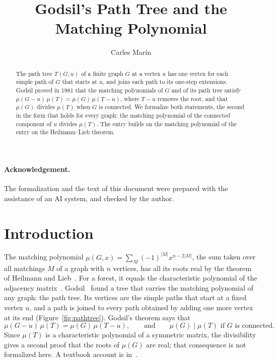 \documentclass[10pt,a4paper]{article}
\begin{document}
\title{Godsil's Path Tree and the Matching Polynomial}
\author{Carles Mar\'in}
\maketitle

\begin{abstract}
The path tree $T(G, u)$ of a finite graph $G$ at a vertex $u$ has one vertex for each simple path of $G$ that starts
at $u$, and joins each path to its one-step extensions. Godsil proved in 1981 that the matching polynomials of $G$
and of its path tree satisfy $\mu(G-u)\,\mu(T) = \mu(G)\,\mu(T-u)$, where $T - u$ removes the root, and that
$\mu(G)$ divides $\mu(T)$ when $G$ is connected. We formalize both statements, the second in the form that holds for
every graph: the matching polynomial of the connected component of $u$ divides $\mu(T)$. The entry builds on the
matching polynomial of the entry on the Heilmann--Lieb theorem.
\end{abstract}

\paragraph{Acknowledgement.} The formalization and the text of this document were prepared with the
assistance of an AI system, and checked by the author.

\tableofcontents

\section*{Introduction}

The matching polynomial $\mu(G, x) = \sum_M (-1)^{|M|} x^{n - 2|M|}$, the sum taken over all matchings $M$ of a graph
with $n$ vertices, has all its roots real by the theorem of Heilmann and Lieb~\cite{HeilmannLieb1972}. For a forest,
it equals the characteristic polynomial of the adjacency matrix~\cite{GodsilGutman1981}. Godsil~\cite{Godsil1981}
found a tree that carries the matching polynomial of any graph: the path tree. Its vertices are the simple paths that
start at a fixed vertex $u$, and a path is joined to every path obtained by adding one more vertex at its end
(Figure~\ref{fig:pathtree}). Godsil's theorem says that
\[
  \mu(G - u)\,\mu(T) = \mu(G)\,\mu(T - u), \qquad\text{and}\qquad \mu(G) \mid \mu(T) \text{ if $G$ is connected.}
\]
Since $\mu(T)$ is a characteristic polynomial of a symmetric matrix, the divisibility gives a second proof that the
roots of $\mu(G)$ are real; that consequence is not formalized here. A textbook account is in~\cite{Godsil1993}.
\end{document}
